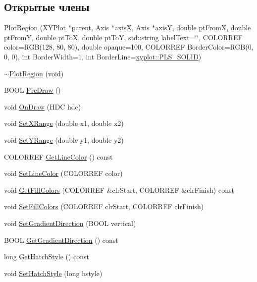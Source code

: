 \subsection*{Открытые члены}
\begin{DoxyCompactItemize}
\item 
\hyperlink{class_plot_region_aa20c4158814429875632d6d873a41aeb}{Plot\-Region} (\hyperlink{class_x_y_plot}{X\-Y\-Plot} $\ast$parent, \hyperlink{class_axis}{Axis} $\ast$axis\-X, \hyperlink{class_axis}{Axis} $\ast$axis\-Y, double pt\-From\-X, double pt\-From\-Y, double pt\-To\-X, double pt\-To\-Y, std\-::string label\-Text=\char`\"{}\char`\"{}, C\-O\-L\-O\-R\-R\-E\-F color=R\-G\-B(128, 80, 80), double opaque=100, C\-O\-L\-O\-R\-R\-E\-F Border\-Color=R\-G\-B(0, 0, 0), int Border\-Width=1, int Border\-Line=\hyperlink{namespacexyplot_a3d67107a3da8dc1ef0114ab0352e01eda50f3326c8ff8eb69d629156dfe2e268a}{xyplot\-::\-P\-L\-S\-\_\-\-S\-O\-L\-I\-D})
\item 
\hyperlink{class_plot_region_a30f37de224be906ff032def46b311d3c}{$\sim$\-Plot\-Region} (void)
\item 
B\-O\-O\-L \hyperlink{class_plot_region_a6a71fbeed8f2de90fe6e069a9b2e22c0}{Pre\-Draw} ()
\item 
void \hyperlink{class_plot_region_a508939830f7e43969b099c2836db5c4e}{On\-Draw} (H\-D\-C hdc)
\item 
void \hyperlink{class_plot_region_a8e8d84c8bca2c5badf833ec55e4ac089}{Set\-X\-Range} (double x1, double x2)
\item 
void \hyperlink{class_plot_region_a906d6cdb0f52224b37dc93fe5e3a2a98}{Set\-Y\-Range} (double y1, double y2)
\item 
C\-O\-L\-O\-R\-R\-E\-F \hyperlink{class_plot_region_a8c9115a80a42634d87a6ee1e95dd62d1}{Get\-Line\-Color} () const 
\item 
void \hyperlink{class_plot_region_aea5ce8db7c4e5ad0383b5bca8ceeceba}{Set\-Line\-Color} (C\-O\-L\-O\-R\-R\-E\-F color)
\item 
void \hyperlink{class_plot_region_aa627b45cacdbc50c3f6ae4cfbb66b75b}{Get\-Fill\-Colors} (C\-O\-L\-O\-R\-R\-E\-F \&clr\-Start, C\-O\-L\-O\-R\-R\-E\-F \&clr\-Finish) const 
\item 
void \hyperlink{class_plot_region_a7cb18f693dc5ca91e5220d753dcd710a}{Set\-Fill\-Colors} (C\-O\-L\-O\-R\-R\-E\-F clr\-Start, C\-O\-L\-O\-R\-R\-E\-F clr\-Finish)
\item 
void \hyperlink{class_plot_region_a973f741072a09ad701f31fd8cf8c7178}{Set\-Gradient\-Direction} (B\-O\-O\-L vertical)
\item 
B\-O\-O\-L \hyperlink{class_plot_region_a1a8c4048030e64ec3d29361363f6b3f3}{Get\-Gradient\-Direction} () const 
\item 
long \hyperlink{class_plot_region_a47b86ae228fae33d9448f8ac3c2a7c05}{Get\-Hatch\-Style} () const 
\item 
void \hyperlink{class_plot_region_afef080fb216a51c6a90f4b4ac8050ee2}{Set\-Hatch\-Style} (long hstyle)
\end{DoxyCompactItemize}
